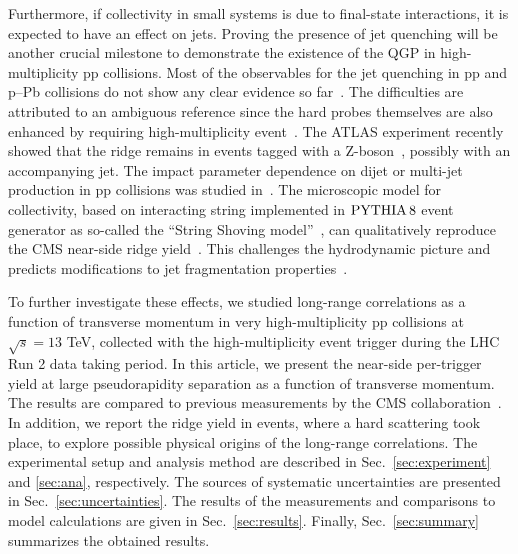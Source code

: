 Furthermore, if collectivity in small systems is due to final-state interactions, it is expected to have an effect on jets. Proving the presence of jet quenching will be another crucial milestone to demonstrate the existence of the QGP in high-multiplicity pp collisions. Most of the observables for the jet quenching in pp and p--Pb collisions do not show any clear evidence so far~\cite{Khachatryan:2016odn,Adam:2016jfp,Adam:2016dau,Acharya:2017okq}. The difficulties are attributed to an ambiguous reference since the hard probes themselves are also enhanced by requiring high-multiplicity event~\cite{Adam:2016jfp,Acharya:2018egz}.
The ATLAS experiment recently showed that the ridge remains in events tagged with a Z-boson~\cite{Aaboud:2019mcw}, possibly with an accompanying jet.
The impact parameter dependence on dijet or multi-jet production in pp collisions was studied in~\cite{Frankfurt:2003td,Frankfurt:2010ea}.
The microscopic model for collectivity, based on interacting string implemented in $\mathrm{PYTHIA}\,8$ event generator as so-called the ``String Shoving model''~\cite{Bierlich:2017vhg}, can qualitatively reproduce the CMS near-side ridge yield~\cite{Khachatryan:2016txc}. This challenges the hydrodynamic picture and predicts modifications to jet fragmentation
properties~\cite{Bierlich:2019ixq}.

% 

To further investigate these effects, we studied long-range correlations as a function of transverse momentum in very high-multiplicity pp collisions at $\sqrt{s} =13$ TeV, collected with the high-multiplicity event trigger during the LHC Run 2 data taking period. In this article, we present the near-side per-trigger yield at large pseudorapidity separation as a function of transverse momentum. The results are compared to previous measurements by the CMS collaboration~\cite{Khachatryan:2015lva}. In addition, we report the ridge yield in events, where a hard scattering took place, to explore possible physical origins of the long-range correlations.
The experimental setup and analysis method are described in Sec.~\ref{sec:experiment} and \ref{sec:ana}, respectively. The sources of systematic uncertainties are presented in Sec.~\ref{sec:uncertainties}. The results of the measurements and comparisons to model calculations are given in Sec.~\ref{sec:results}. Finally, Sec.~\ref{sec:summary} summarizes the obtained results.


